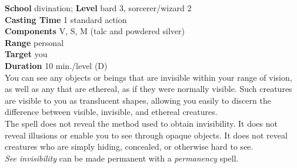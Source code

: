 \textbf{School} divination; \textbf{Level} bard 3, sorcerer/wizard 2\\
\textbf{Casting Time} 1 standard action\\
\textbf{Components} V, S, M (talc and powdered silver)\\
\textbf{Range} personal\\
\textbf{Target} you\\
\textbf{Duration} 10 min./level (D)\\
You can see any objects or beings that are invisible within your range of vision, as well as any that are ethereal, as if they were normally visible. Such creatures are visible to you as translucent shapes, allowing you easily to discern the difference between visible, invisible, and ethereal creatures.\\
The spell does not reveal the method used to obtain invisibility. It does not reveal illusions or enable you to see through opaque objects. It does not reveal creatures who are simply hiding, concealed, or otherwise hard to see.\\
\textit{See invisibility }can be made permanent with a \textit{permanency }spell.\\
